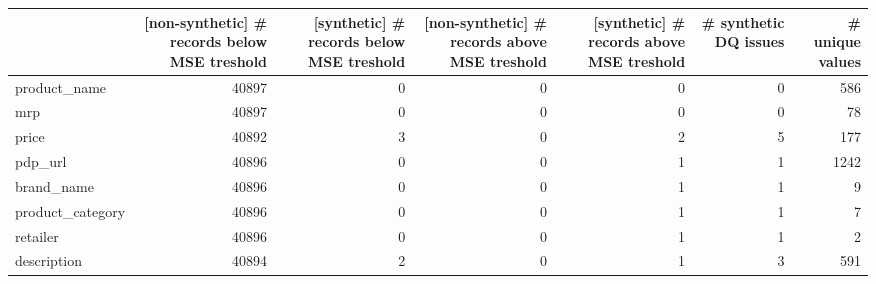 \begin{tabular}{lrrrrrr}
\toprule
{} &  [non-synthetic] \# records below MSE treshold &  [synthetic] \# records below MSE treshold &  [non-synthetic] \# records above MSE treshold &  [synthetic] \# records above MSE treshold &  \# synthetic DQ issues &  \# unique values \\
\midrule
product\_name     &                                         40897 &                                         0 &                                             0 &                                         0 &                      0 &              586 \\
mrp              &                                         40897 &                                         0 &                                             0 &                                         0 &                      0 &               78 \\
price            &                                         40892 &                                         3 &                                             0 &                                         2 &                      5 &              177 \\
pdp\_url          &                                         40896 &                                         0 &                                             0 &                                         1 &                      1 &             1242 \\
brand\_name       &                                         40896 &                                         0 &                                             0 &                                         1 &                      1 &                9 \\
product\_category &                                         40896 &                                         0 &                                             0 &                                         1 &                      1 &                7 \\
retailer         &                                         40896 &                                         0 &                                             0 &                                         1 &                      1 &                2 \\
description      &                                         40894 &                                         2 &                                             0 &                                         1 &                      3 &              591 \\

\end{tabular}
